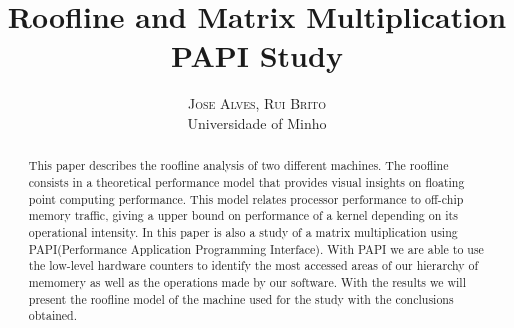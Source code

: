 \documentclass[twoside]{article}
\title{\vspace{-15mm}\fontsize{24pt}{10pt}\selectfont\textbf{Roofline and Matrix Multiplication PAPI Study}} %
\author{
\large
\textsc{Jose Alves, Rui Brito}\\[2mm] %
\normalsize Universidade of Minho \\ %
\vspace{-5mm}
}
\date{}
\begin{document}
\maketitle %

\thispagestyle{fancy} %


\begin{abstract}

\noindent 
This paper describes the roofline analysis of two different machines. The roofline consists in a theoretical performance model that provides visual insights on floating point computing performance. This model relates processor performance to off-chip memory traffic, giving a upper bound on performance of a kernel depending on its operational intensity. In this paper is also a study of a matrix multiplication using PAPI(Performance Application Programming Interface). With PAPI we are able to use the low-level hardware counters to identify the most accessed areas of our hierarchy of memomery as well as the operations made by our software. With the results we will present the roofline model of the machine used for the study with the conclusions obtained.

\end{abstract}

\end{document}
